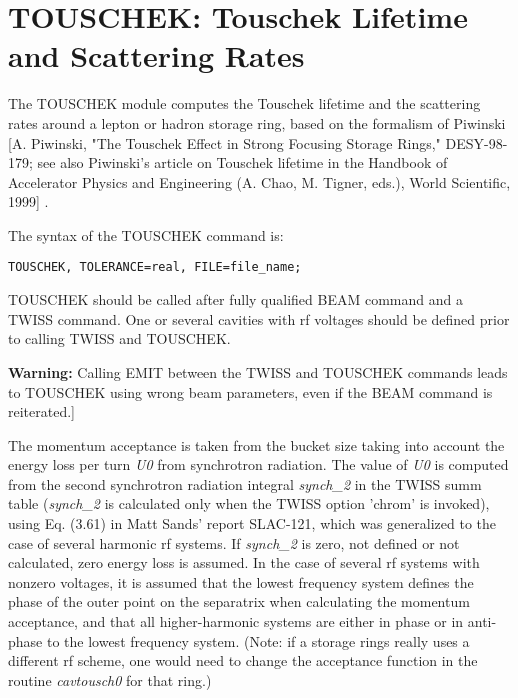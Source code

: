 
\chapter{TOUSCHEK: Touschek Lifetime and Scattering Rates}

The TOUSCHEK module computes the Touschek lifetime and the scattering rates 
around a lepton or hadron storage ring, based on the formalism of Piwinski [A. 
Piwinski, "The Touschek Effect in Strong Focusing Storage Rings," DESY-98-179; 
see also Piwinski's article on Touschek lifetime in the Handbook of Accelerator 
Physics and Engineering (A. Chao, M. Tigner, eds.), World Scientific, 1999] .

The syntax of the TOUSCHEK command is: 
\begin{verbatim}
TOUSCHEK, TOLERANCE=real, FILE=file_name;
\end{verbatim}

TOUSCHEK should be called after fully qualified BEAM command and a TWISS
command. One or several cavities with rf voltages should be defined
prior to calling TWISS and TOUSCHEK. 

{\bf Warning:} Calling EMIT between the TWISS and TOUSCHEK commands
leads to TOUSCHEK using wrong beam parameters, even if the BEAM command
is reiterated.] 
 
The momentum acceptance is taken from the bucket size taking into
account the  energy loss per turn \textit{U0} from synchrotron
radiation. The value of \textit{U0} is computed from the second
synchrotron radiation integral \textit{synch\_2} in the TWISS summ table
(\textit{synch\_2} is calculated only when the TWISS option 'chrom' is
invoked), using Eq. (3.61) in Matt Sands' report SLAC-121, which was
generalized to the case of several harmonic rf systems. If
\textit{synch\_2} is zero, not defined or not calculated, zero energy loss is
assumed. In the case of several rf systems with nonzero voltages, it is
assumed that the lowest frequency system defines the phase of the outer
point on the separatrix when calculating the momentum acceptance, and
that all higher-harmonic systems are either in phase or in anti-phase to
the lowest frequency system. (Note: if a storage rings really uses a
different rf scheme, one would need to change the acceptance function in
the routine \textit{cavtousch0} for that ring.) 

